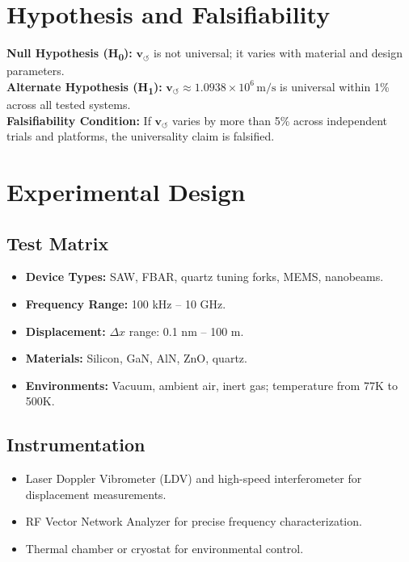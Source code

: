         \section*{Hypothesis and Falsifiability}
        \textbf{Null Hypothesis (H\textsubscript{0}):} \( \mathbf{v}_{\scriptscriptstyle\boldsymbol{\circlearrowleft}} \) is not universal; it varies with material and design parameters.\\
        \textbf{Alternate Hypothesis (H\textsubscript{1}):} \( \mathbf{v}_{\scriptscriptstyle\boldsymbol{\circlearrowleft}} \approx 1.0938 \times 10^6 \, \text{m/s} \) is universal within 1\% across all tested systems.\\

        \noindent\textbf{Falsifiability Condition:} If \( \mathbf{v}_{\scriptscriptstyle\boldsymbol{\circlearrowleft}} \) varies by more than 5\% across independent trials and platforms, the universality claim is falsified.

        \section*{Experimental Design}

        \subsection*{Test Matrix}
        \begin{itemize}
            \item \textbf{Device Types:} SAW, FBAR, quartz tuning forks, MEMS, nanobeams.
            \item \textbf{Frequency Range:} 100 kHz -- 10 GHz.
            \item \textbf{Displacement:} \( \Delta x \) range: 0.1 nm -- 100 \textmu m.
            \item \textbf{Materials:} Silicon, GaN, AlN, ZnO, quartz.
            \item \textbf{Environments:} Vacuum, ambient air, inert gas; temperature from 77K to 500K.
        \end{itemize}

        \subsection*{Instrumentation}
        \begin{itemize}
            \item Laser Doppler Vibrometer (LDV) and high-speed interferometer for displacement measurements.
            \item RF Vector Network Analyzer for precise frequency characterization.
            \item Thermal chamber or cryostat for environmental control.
        \end{itemize}

